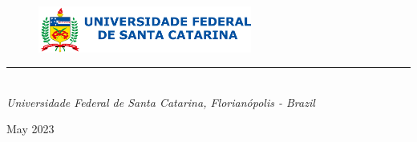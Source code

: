 %
%
%
%
%

\begin{titlepage}

\thispagestyle{empty}

\begin{flushleft}
\end{flushleft}

\vspace{1cm}

\begin{figure}[!ht]
    \begin{flushleft}
        \includegraphics[width=7cm]{figures/horizontal_fundo_claro.png}
    \end{flushleft}
\end{figure}

\begin{flushleft}
\Huge{\textbf{\thetitle}}
\rule[0pt]{\textwidth}{5pt}
\end{flushleft}

\vspace{0.2cm}

\begin{flushleft}
\textit{\thetitle} \\
\textit{Universidade Federal de Santa Catarina, Florianópolis - Brazil}
\end{flushleft}

\vfill
\vfill

\begin{flushright}
May 2023
\end{flushright}

\end{titlepage}
